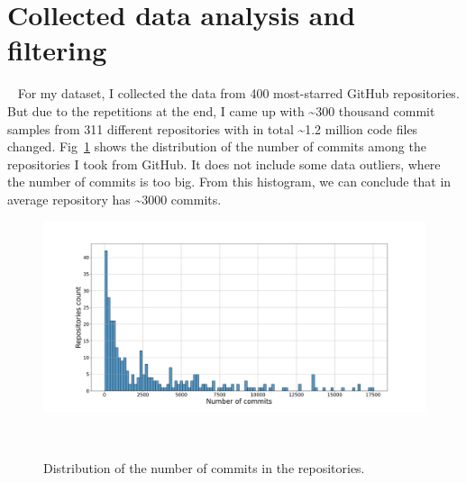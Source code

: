 \section{Collected data analysis and filtering}~\label{sec:data_analysis}
For my dataset, I collected the data from 400 most-starred GitHub repositories. But due to the repetitions at the end, I came up with \textasciitilde{}300 thousand commit samples from 311 different repositories with in total \textasciitilde{}1.2 million code files changed. Fig~\ref{fig:commits_distribution} shows the distribution of the number of commits among the repositories I took from GitHub. It does not include some data outliers, where the number of commits is too big. From this histogram, we can conclude that in average repository has \textasciitilde{}3000 commits. 
\begin{figure}[H]
    \includegraphics[scale=0.30]{figs/Commits distribution.png}
    \caption{Distribution of the number of commits in the repositories.}~\label{fig:commits_distribution}
\end{figure}

